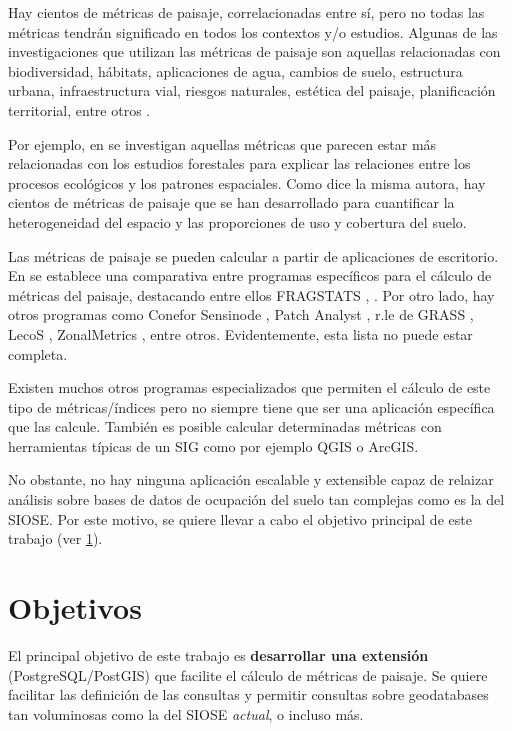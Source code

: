 Hay cientos de métricas de paisaje, correlacionadas entre sí, pero no todas las métricas tendrán significado en todos los contextos y/o estudios. Algunas de las investigaciones que utilizan las métricas de paisaje son aquellas relacionadas con biodiversidad, hábitats, aplicaciones de agua, cambios de suelo, estructura urbana, infraestructura vial, riesgos naturales, estética del paisaje, planificación territorial, entre otros \cite{Uuemaa2009}.

Por ejemplo, en \cite{Uuemaa2017} se investigan aquellas métricas que parecen estar más relacionadas con los estudios forestales para explicar las relaciones entre los procesos ecológicos y los patrones espaciales. Como dice la misma autora, hay cientos de métricas de paisaje que se han desarrollado para cuantificar la heterogeneidad del espacio y las proporciones de uso y cobertura del suelo.

Las métricas de paisaje se pueden calcular a partir de aplicaciones de escritorio. En \cite{Zaragozi2012} se establece una comparativa entre programas específicos para el cálculo de métricas del paisaje, destacando entre ellos FRAGSTATS \cite{McGarigal1994}, \cite{McGarigal2015}. Por otro lado, hay otros programas como Conefor Sensinode \cite{Saura2009}, Patch Analyst \cite{Zaragozi2012}, r.le de GRASS \cite{Baker1992}, LecoS \cite{Jung2016}, ZonalMetrics \cite{Adamczyk2017}, entre otros. Evidentemente, esta lista no puede estar completa. 

Existen muchos otros programas especializados que permiten el cálculo de este tipo de métricas/índices pero no siempre tiene que ser una aplicación específica que las calcule. También es posible calcular determinadas métricas con herramientas típicas de un SIG como por ejemplo QGIS o ArcGIS.

No obstante, no hay ninguna aplicación escalable y extensible capaz de relaizar análisis sobre bases de datos de ocupación del suelo tan complejas como es la del SIOSE. Por este motivo, se quiere llevar a cabo el objetivo principal de este trabajo (ver \ref{sec:objetivos}).


\section{Objetivos}\label{sec:objetivos}

El principal objetivo de este trabajo es \textbf{desarrollar una extensión} (PostgreSQL/PostGIS) que facilite el cálculo de métricas de paisaje. Se quiere facilitar las definición de las consultas y permitir consultas sobre geodatabases tan voluminosas como la del SIOSE \textit{actual}, o incluso más.

